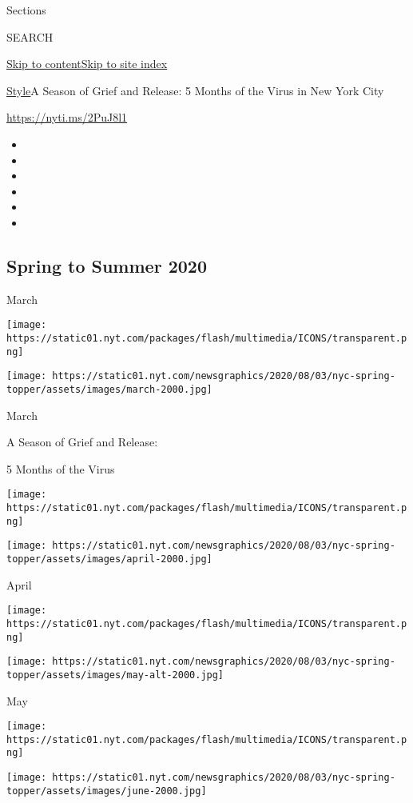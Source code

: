 Sections

SEARCH

\protect\hyperlink{site-content}{Skip to
content}\protect\hyperlink{site-index}{Skip to site index}

\href{/section/style}{Style}\textbar{}A Season of Grief and Release: 5
Months of the Virus in New York City

\href{https://nyti.ms/2PuJ8l1}{https://nyti.ms/2PuJ8l1}

\begin{itemize}
\item
\item
\item
\item
\item
\item
\end{itemize}

\hypertarget{spring-to-summer-2020}{%
\subsection{Spring to Summer 2020}\label{spring-to-summer-2020}}

March

\texttt{[image: https://static01.nyt.com/packages/flash/multimedia/ICONS/transparent.png]}

\texttt{[image: https://static01.nyt.com/newsgraphics/2020/08/03/nyc-spring-topper/assets/images/march-2000.jpg]}

March

A Season of Grief and Release:

5 Months of the Virus

\texttt{[image: https://static01.nyt.com/packages/flash/multimedia/ICONS/transparent.png]}

\texttt{[image: https://static01.nyt.com/newsgraphics/2020/08/03/nyc-spring-topper/assets/images/april-2000.jpg]}

April

\texttt{[image: https://static01.nyt.com/packages/flash/multimedia/ICONS/transparent.png]}

\texttt{[image: https://static01.nyt.com/newsgraphics/2020/08/03/nyc-spring-topper/assets/images/may-alt-2000.jpg]}

May

\texttt{[image: https://static01.nyt.com/packages/flash/multimedia/ICONS/transparent.png]}

\texttt{[image: https://static01.nyt.com/newsgraphics/2020/08/03/nyc-spring-topper/assets/images/june-2000.jpg]}

